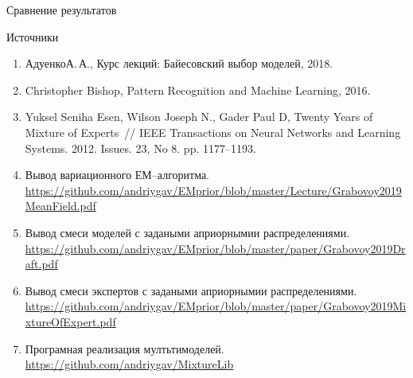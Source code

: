 \documentclass[9pt,pdf,hyperref={unicode}]{beamer}
\begin{document}
\begin{frame}{Сравнение результатов}
\begin{figure}
\end{figure}
\end{frame}
\begin{frame}{Источники}
\justifying
\begin{enumerate}
	\item Адуенко\;А.\,А., Курс лекций: Байесовский выбор моделей, 2018.
	\item Christopher Bishop, Pattern Recognition and Machine Learning, 2016.
	\item Yuksel Seniha Esen, Wilson Joseph N., Gader Paul D, Twenty Years of Mixture of Experts~// IEEE Transactions on Neural Networks and Learning Systems. 2012. Issues. 23, No 8. pp. 1177–1193.
	\item Вывод вариационного ЕМ--алгоритма. \url{https://github.com/andriygav/EMprior/blob/master/Lecture/Grabovoy2019MeanField.pdf}
	\item Вывод смеси моделей с задаными априорнымии распределениями. \url{https://github.com/andriygav/EMprior/blob/master/paper/Grabovoy2019Draft.pdf}
	\item Вывод смеси экспертов с задаными априорнымии распределениями. \url{https://github.com/andriygav/EMprior/blob/master/paper/Grabovoy2019MixtureOfExpert.pdf}
	\item Програмная реализация мултьтимоделей. \url{https://github.com/andriygav/MixtureLib}
\end{enumerate}
\end{frame}
\end{document}
